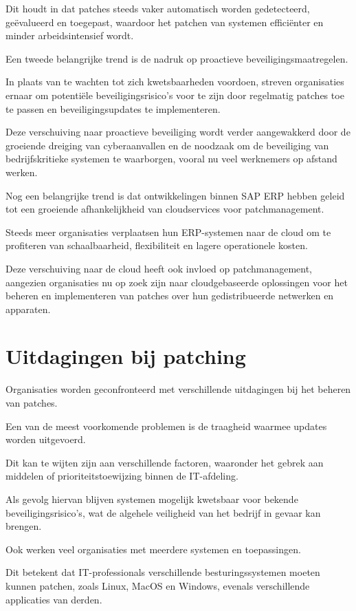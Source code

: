  Dit houdt in dat patches steeds vaker automatisch worden gedetecteerd, geëvalueerd en toegepast, waardoor het patchen van systemen efficiënter en minder arbeidsintensief wordt.

 
Een tweede belangrijke trend is de nadruk op proactieve beveiligingsmaatregelen.

 In plaats van te wachten tot zich kwetsbaarheden voordoen, streven organisaties ernaar om potentiële beveiligingsrisico's voor te zijn door regelmatig patches toe te passen en beveiligingsupdates te implementeren.

 Deze verschuiving naar proactieve beveiliging wordt verder aangewakkerd door de groeiende dreiging van cyberaanvallen en de noodzaak om de beveiliging van bedrijfskritieke systemen te waarborgen, vooral nu veel werknemers op afstand werken.

 
Nog een belangrijke trend is dat ontwikkelingen binnen SAP ERP hebben geleid tot een groeiende afhankelijkheid van cloudservices voor patchmanagement.

 Steeds meer organisaties verplaatsen hun ERP-systemen naar de cloud om te profiteren van schaalbaarheid, flexibiliteit en lagere operationele kosten.

 Deze verschuiving naar de cloud heeft ook invloed op patchmanagement, aangezien organisaties nu op zoek zijn naar cloudgebaseerde oplossingen voor het beheren en implementeren van patches over hun gedistribueerde netwerken en apparaten.

 \autocite{Kannan2023}
\section{Uitdagingen bij patching}
Organisaties worden geconfronteerd met verschillende uitdagingen bij het beheren van patches.

 Een van de meest voorkomende problemen is de traagheid waarmee updates worden uitgevoerd.

 Dit kan te wijten zijn aan verschillende factoren, waaronder het gebrek aan middelen of prioriteitstoewijzing binnen de IT-afdeling.

 Als gevolg hiervan blijven systemen mogelijk kwetsbaar voor bekende beveiligingsrisico's, wat de algehele veiligheid van het bedrijf in gevaar kan brengen.

 \autocite{AppMaster2023}
Ook werken veel organisaties met meerdere systemen en toepassingen.

 Dit betekent dat IT-professionals verschillende besturingssystemen moeten kunnen patchen, zoals Linux, MacOS en Windows, evenals verschillende applicaties van derden.


